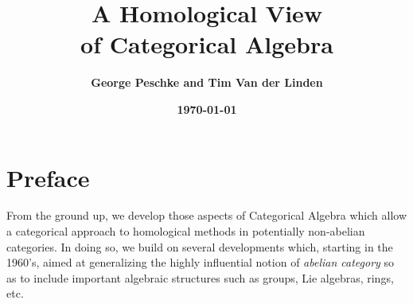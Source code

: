 \documentclass [12pt,oneside]{book}%
\theoremstyle{captionstyle}  %
\begin{document}
\title{\bfseries\Huge A Homological View\\ of Categorical Algebra}
\author{\bfseries\Large George Peschke and Tim Van der Linden}
\date{\textbf{\today}}
\maketitle

\thispagestyle{empty}
\newpage

\pagestyle{plain} %

\tableofcontents

\newpage

\pagestyle{fancy}   %
\setcounter{page}{1}
%
\rhead{\bfseries\footnotesize%
}
\chapter*{Preface}

From the ground up, we develop those aspects of Categorical Algebra which allow a categorical approach to homological methods in potentially non-abelian categories. In doing so, we build on several developments which, starting in the 1960's, aimed at generalizing the highly influential notion of \emph{abelian category} \cite{Buchsbaum:ExactCats,Tohoku} so as to include important algebraic structures such as groups, Lie algebras, rings, etc.
\end{document}
